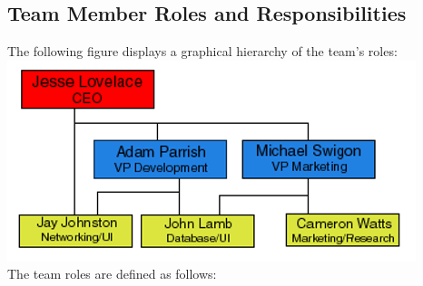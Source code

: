 \documentclass{report}
\begin{document}
        \subsection{Team Member Roles and Responsibilities}
            The following figure displays a graphical hierarchy of the team's
            roles:\\

            \includegraphics{organization.png}
            \\The team roles are defined as follows:
\end{document}
